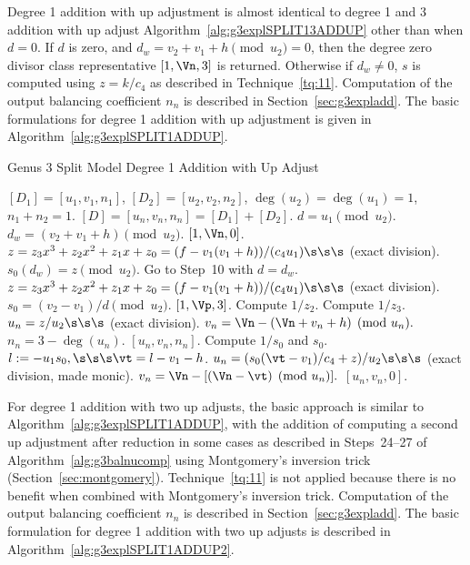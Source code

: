 Degree 1 addition with up adjustment is almost identical to degree 1 and 3
addition with up adjust Algorithm~\ref{alg:g3explSPLIT13ADDUP} other than when
$d = 0$. If $d$  is zero, and $d_w = v_2 + v_1 + h \pmod{u_2} = 0$, then the
degree zero divisor class representative $[1,\Vn,3]$ is returned. Otherwise if
$d_w \neq 0$, $s$ is computed using $z = k/c_4$ as described in
Technique~\ref{tq:11}. Computation of the output balancing coefficient $n_n$ is
described in Section~\ref{sec:g3expladd}. The basic formulations for degree 1
addition with up adjustment is given in Algorithm~\ref{alg:g3explSPLIT1ADDUP}.

\begin{algorithm}[H]
\caption{Genus 3 Split Model Degree 1 Addition with Up Adjust\label{alg:g3explSPLIT1ADDUP}}
\begin{algorithmic} [1]
\Require $[D_1] = [u_1,v_1,n_1]$, $[D_2] = [u_2,v_2,n_2]$, $\deg(u_2) = \deg(u_1) = 1$, $n_1 + n_2 = 1$.
\Ensure $[D] = [u_n,v_n,n_n] = [D_1] + [D_2] $.
\algrule
\vspace{-2pt}
\State $d = u_1 \pmod{u_2}$.
    \State $d_w = (v_2 + v_1 + h) \pmod{u_2}$.
     \hspace{3pt} \Return $[1,\Vn, 0]$.
    \EndIf
    \State $z = z_3x^3 + z_2x^2 + z_1x + z_0 = (f - v_1(v_1 + h))/(c_4u_1) \s\s\s$ (exact division).  
    \State $s_0(d_w) = z \pmod{u_2}$.
    \State Go to Step~10 with $d = d_w$.
\EndIf
\State $z = z_3x^3 + z_2x^2 + z_1x + z_0 = (f - v_1(v_1 + h))/(c_4u_1) \s\s\s$ (exact division).  
\State $s_0 = (v_2 - v_1)/d \pmod{u_2}$.
         \Return $[1,\Vp,3]$.
        \Else \hspace{3pt} Compute $1/z_2$.
        \EndIf
    \Else \hspace{3pt} Compute $1/z_3$.
    \EndIf
    \State $u_n = z/u_2 \s\s\s$ (exact division).
    \State $v_n = \Vn - (\Vn + v_n + h) \pmod{u_n}.$
    \State $n_n = 3 - \deg(u_n)$.
    \State \Return $[u_n,v_n,n_n]$.
\EndIf
\State Compute $1/s_0$ and $s_0$.
\State $l := -u_1s_0, \s\s\s \vt = l - v_1 - h$.
\State $u_n = (s_0(\vt - v_1)/c_4 + z)/u_2 \s\s\s$ (exact division, made monic).
\State $v_n = \Vn - [(\Vn - \vt) \pmod{u_n}].$ 
\State \Return $[u_n,v_n,0]$.
\vspace{-2pt}
\end{algorithmic}
\end{algorithm}

For degree 1 addition with two up adjusts, the basic approach is similar to
Algorithm~\ref{alg:g3explSPLIT1ADDUP}, with the addition of computing a second
up adjustment after reduction in some cases as described in Steps~24--27 of
Algorithm~\ref{alg:g3balnucomp} using Montgomery's inversion trick
(Section~\ref{sec:montgomery}). Technique~\ref{tq:11} is not applied because
there is no benefit when combined with Montgomery's inversion trick. Computation
of the output balancing coefficient $n_n$ is described in
Section~\ref{sec:g3expladd}. The basic formulation for degree 1 addition with two
up adjusts is described in Algorithm~\ref{alg:g3explSPLIT1ADDUP2}.

